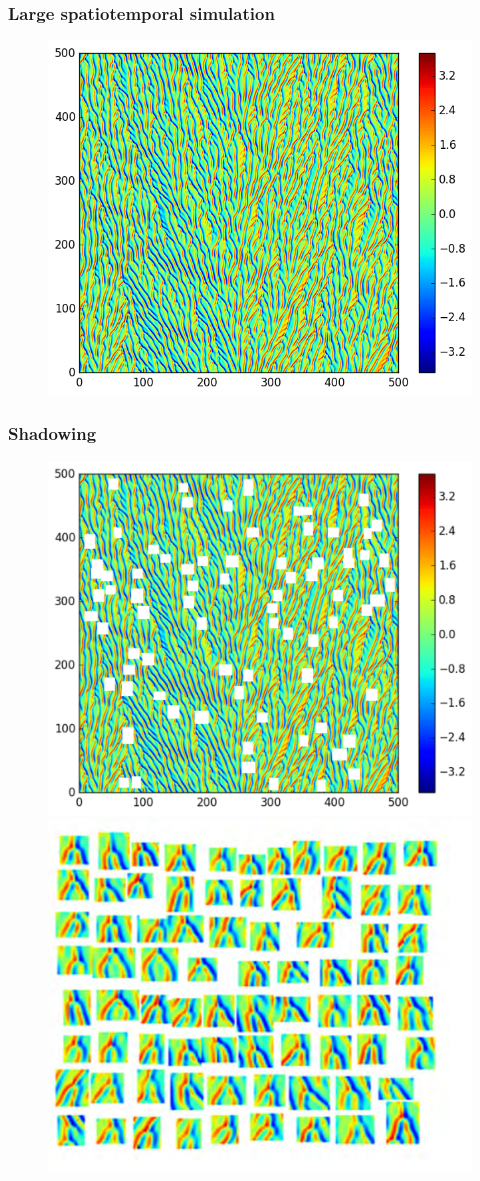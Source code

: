 \documentclass[mathserif, handout]{beamer}
\begin{document}
\begin{frame}
    \frametitle{Large spatiotemporal simulation}
\begin{figure}[h]
\includegraphics[width=.6\textwidth]{MNG_uu500b500}
\end{figure}
\end{frame}

\begin{frame}
    \frametitle{Shadowing}
\begin{figure}[h]
\includegraphics[width=.48\textwidth]{MNG_uu500b500co}
\includegraphics[width=.48\textwidth]{cutouts}
\end{figure}
\end{frame}
\end{document}
